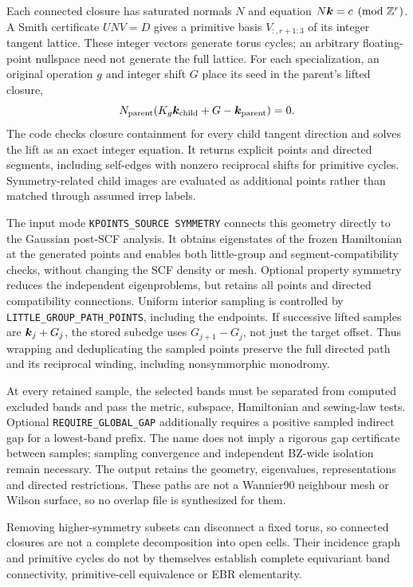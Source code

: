 Each connected closure has saturated normals $N$ and equation
$N\bm{k}=c\pmod{\mathbb Z^r}$. A Smith certificate $UNV=D$ gives a
primitive basis $V_{:,r+1:3}$ of its integer tangent lattice. These
integer vectors generate torus cycles; an arbitrary floating-point
nullspace need not generate the full lattice. For each specialization,
an original operation $g$ and integer shift $G$ place its seed in the
parent's lifted closure,
\begin{equation}
 N_{\rm parent}(K_g\bm{k}_{\rm child}+G-\bm{k}_{\rm parent})=0.
\end{equation}
The code checks closure containment for every child tangent direction
and solves the lift as an exact integer equation. It returns explicit
points and directed segments, including self-edges with nonzero
reciprocal shifts for primitive cycles. Symmetry-related child images
are evaluated as additional points rather than matched through
assumed irrep labels.

The input mode \texttt{KPOINTS\_SOURCE SYMMETRY} connects this geometry
directly to the Gaussian post-SCF analysis. It obtains eigenstates of the
frozen Hamiltonian at the generated points and enables both little-group
and segment-compatibility checks, without changing the SCF density or
mesh. Optional property symmetry reduces the independent eigenproblems,
but retains all points and directed compatibility connections.
Uniform interior sampling is controlled by
\texttt{LITTLE\_GROUP\_PATH\_POINTS}, including the endpoints.
If successive lifted samples are $\bm{k}_j+G_j$, the stored subedge
uses $G_{j+1}-G_j$, not just the target offset. Thus wrapping and
deduplicating the sampled points preserve the full directed path and
its reciprocal winding, including nonsymmorphic monodromy.

At every retained sample, the selected bands must be separated from
computed excluded bands and pass the metric, subspace, Hamiltonian
and sewing-law tests. Optional \texttt{REQUIRE\_GLOBAL\_GAP} additionally
requires a positive sampled indirect gap for a lowest-band prefix.
The name does not imply a rigorous gap certificate between samples;
sampling convergence and independent BZ-wide isolation remain necessary.
The output retains the geometry, eigenvalues, representations and
directed restrictions. These paths are not a Wannier90 neighbour mesh
or Wilson surface, so no overlap file is synthesized for them.

Removing higher-symmetry subsets
can disconnect a fixed torus, so connected closures are not a complete
decomposition into open cells. Their incidence graph and primitive
cycles do not by themselves establish complete equivariant band
connectivity, primitive-cell equivalence or EBR elementarity.

